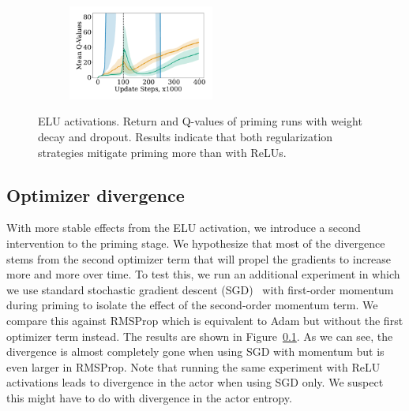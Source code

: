 \begin{figure}[H]
\begin{minipage}[b]{.62\textwidth}
\begin{subfigure}[b]{0.5\textwidth}
        \label{subfig:elu_priming_abl_ret}
    \end{subfigure}%
    \begin{subfigure}[b]{0.5\textwidth}
    \centering
        \includegraphics[width=4.8cm, trim=1cm 1cm 1cm 1cm ,clip]{figures/dissecting/priming/elu_priming_ablations_Q.pdf}
        \label{subfig:elu_priming_abl_Q}
    \end{subfigure}%
    \vspace{-18pt}
    \caption{ELU activations. Return and
    Q-values of priming runs with weight decay and dropout. Results indicate that both regularization strategies mitigate priming more than with ReLUs. }
    \label{fig:elu_priming_abl}
\end{minipage}
    \vspace{-5pt}
\end{figure}

\subsection{Optimizer divergence} \label{app:priming_opt}

With more stable effects from the ELU activation, we introduce a second intervention to the priming stage. We hypothesize that most of the divergence stems from the second optimizer term that will propel the gradients to increase more and more over time. To test this, we run an additional experiment in which we use standard stochastic gradient descent (SGD)~\parencite{robbins1951stochastic} with first-order momentum~\parencite{rumelhart1986learning, sutskever2013on} during priming to isolate the effect of the second-order momentum term. We compare this against RMSProp which is equivalent to Adam but without the first optimizer term instead. The results are shown in Figure~\ref{app:priming_opt}. As we can see, the divergence is almost completely gone when using SGD with momentum but is even larger in RMSProp. Note that running the same experiment with ReLU activations  leads to divergence in the actor when using SGD only. We suspect this might have to do with divergence in the actor entropy.

